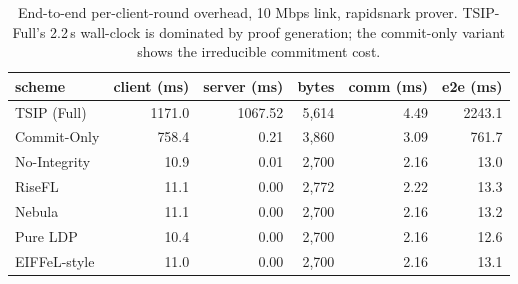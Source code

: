 \begin{table}[t]
\centering
\caption{End-to-end per-client-round overhead, 10 Mbps link, rapidsnark prover. TSIP-Full's 2.2\,s wall-clock is dominated by proof generation; the commit-only variant shows the irreducible commitment cost.}
\label{tab:overhead-7schemes}
\small
\begin{tabular}{lrrrrr}
\toprule
scheme & client (ms) & server (ms) & bytes & comm (ms) & e2e (ms) \\
\midrule
TSIP (Full) & 1171.0 & 1067.52 & 5,614 & 4.49 & 2243.1 \\
Commit-Only & 758.4 & 0.21 & 3,860 & 3.09 & 761.7 \\
No-Integrity & 10.9 & 0.01 & 2,700 & 2.16 & 13.0 \\
RiseFL & 11.1 & 0.00 & 2,772 & 2.22 & 13.3 \\
Nebula & 11.1 & 0.00 & 2,700 & 2.16 & 13.2 \\
Pure LDP & 10.4 & 0.00 & 2,700 & 2.16 & 12.6 \\
EIFFeL-style & 11.0 & 0.00 & 2,700 & 2.16 & 13.1 \\
\bottomrule
\end{tabular}
\end{table}
